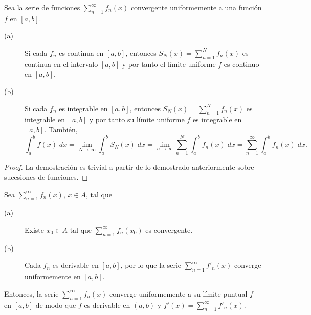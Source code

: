 \begin{ftheorem}[]
	\normalfont Sea la serie de funciones $\displaystyle \sum^{\infty}_{n = 1}f_{n}\left(x\right) $ convergente uniformemente a una función $\displaystyle f $ en $\displaystyle \left[a,b\right]  $.
	\begin{description}
		\item[(a)] Si cada $\displaystyle f_{n} $ es continua en $\displaystyle \left[a,b\right]  $, entonces $\displaystyle S_{N}\left(x\right) = \sum^{N}_{n = 1}f_{n}\left(x\right) $ es continua en el intervalo $\displaystyle \left[a,b\right]  $ y por tanto el límite uniforme $\displaystyle f $ es continuo en $\displaystyle \left[a,b\right]  $.
		\item[(b)] Si cada $\displaystyle f_{n} $ es integrable en $\displaystyle \left[a,b\right]  $, entonces $\displaystyle S_{N}\left(x\right) = \sum^{N}_{n = 1}f_{n}\left(x\right) $ es integrable en $\displaystyle \left[a,b\right]  $ y por tanto su límite uniforme $\displaystyle f $ es integrable en $\displaystyle \left[a,b\right]  $. También,
			\[\int^{b}_{a} f\left(x\right) \; dx = \lim_{N \to \infty}\int^{b}_{a} S_{N}\left(x\right) \; dx = \lim_{n \to \infty}\sum^{N}_{n = 1}\int^{b}_{a} f_{n}\left(x\right) \; dx = \sum^{\infty}_{n = 1}\int^{b}_{a} f_{n}\left(x\right) \; dx.\]
	\end{description}
\end{ftheorem}
\begin{proof}
La demostración es trivial a partir de lo demostrado anteriormente sobre sucesiones de funciones.
\end{proof}
\begin{ftheorem}[]
\normalfont Sea $\displaystyle \sum^{\infty}_{n = 1}f_{n}\left(x\right) $, $\displaystyle x \in A $, tal que 
\begin{description}
\item[(a)] Existe $\displaystyle x_{0} \in A $ tal que $\displaystyle \sum^{\infty}_{n = 1}f_{n}\left(x_{0}\right) $ es convergente.
\item[(b)] Cada $\displaystyle f_{n} $ es derivable en $\displaystyle \left[a,b\right]  $, por lo que la serie $\displaystyle \sum^{\infty}_{n = 1}f'_{n}\left(x\right) $ converge uniformemente en $\displaystyle \left[a,b\right]  $.
\end{description}
Entonces, la serie $\displaystyle \sum^{\infty}_{n = 1}f_{n}\left(x\right) $ converge uniformemente a su límite puntual $\displaystyle f $ en $\displaystyle \left[a,b\right]  $ de modo que $\displaystyle f $ es derivable en $\displaystyle \left(a,b\right) $ y $\displaystyle f'\left(x\right) = \sum^{\infty}_{n = 1}f'_{n}\left(x\right) $.
\end{ftheorem}
